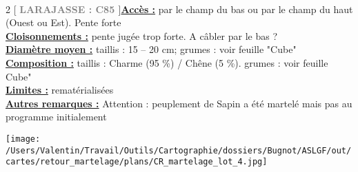 \documentclass[a4paper,openany]{book}\usepackage[]{graphicx}\usepackage[]{color}
\begin{document}
\\\begin{multicols}{2}
[
\textbf{\textcolor{gray}{
\large LARAJASSE : C85
}}
]\noindent\textbf{\underline{Accès :}} par le champ du bas ou par le champ du haut (Ouest ou Est). Pente forte\vspace{0.1cm} \\\noindent\textbf{\underline{Cloisonnements :}} pente jugée trop forte. A câbler par le bas ?\vspace{0.1cm} \\\noindent\textbf{\underline{Diamètre moyen :}} taillis : 15 -- 20 cm; grumes : voir feuille "Cube"\vspace{0.1cm} \\\noindent\textbf{\underline{Composition :}} taillis : Charme (95 \%) / Chêne (5 \%). grumes : voir feuille Cube"\vspace{0.1cm} \\\noindent\textbf{\underline{Limites :}} rematérialisées\vspace{0.1cm} \\\noindent\textbf{\underline{Autres remarques :}} Attention : peuplement de Sapin a été martelé mais pas au programme initialement\vspace{0.1cm} \\\end{multicols}\begin{center}
\texttt{[image: /Users/Valentin/Travail/Outils/Cartographie/dossiers/Bugnot/ASLGF/out/cartes/retour\_martelage/plans/CR\_martelage\_lot\_4.jpg]}
\end{center}\newpage\noindent
\end{document}
